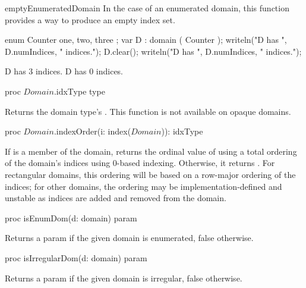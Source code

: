 \begin{chapelexample}{emptyEnumeratedDomain}
In the case of an enumerated domain, this function provides a way to produce an
empty index set.
\begin{chapel}
enum Counter { one, two, three };
var D : domain ( Counter );
writeln("D has ", D.numIndices, " indices.");
D.clear();
writeln("D has ", D.numIndices, " indices.");
\end{chapel}
\begin{chapelprintoutput}
D has 3 indices.
D has 0 indices.
\end{chapelprintoutput}
\end{chapelexample}

\begin{protohead}
proc $Domain$.idxType type
\end{protohead}
\begin{protobody}
Returns the domain type's .
This function is not available on opaque domains.
\end{protobody}

\begin{protohead}
proc $Domain$.indexOrder(i: index($Domain$)): idxType
\end{protohead}
\begin{protobody}
If  is a member of the domain, returns the ordinal value of
 using a total ordering of the domain's indices using 0-based
indexing.  Otherwise, it returns .  For rectangular
domains, this ordering will be based on a row-major ordering of the
indices; for other domains, the ordering may be
implementation-defined and unstable as indices are added and
removed from the domain.
\end{protobody}

\begin{protohead}
proc isEnumDom(d: domain) param
\end{protohead}
\begin{protobody}
Returns a param  if the given domain is enumerated, false otherwise.
\end{protobody}

\begin{protohead}
proc isIrregularDom(d: domain) param
\end{protohead}
\begin{protobody}
Returns a param  if the given domain is irregular, false otherwise.
\end{protobody}

